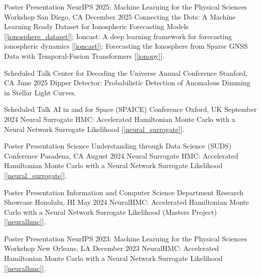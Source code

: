 
\begin{cventries}

\vspace{0mm}

\cventry
{Poster Presentation}
{NeurIPS 2025: Machine Learning for the Physical Sciences Workshop}
{San Diego, CA}
{December 2025}
{
    Connecting the Dots: A Machine Learning Ready Dataset for Ionospheric Forecasting Models [\ref{ionosphere_dataset}]; Ioncast: A deep learning framework for forecasting ionospheric dynamics [\ref{ioncast}]; Forecasting the Ionosphere from Sparse GNSS Data with Temporal-Fusion Transformers [\ref{ionopy}].
}

\vspace{0mm}

\cventry
{Scheduled Talk}
{Center for Decoding the Universe Annual Conference}
{Stanford, CA}
{June 2025}
{
    Dipper Detector: Probabilistic Detection of Anomalous Dimming in Stellar Light Curves.
}

\vspace{0mm}

\cventry
{Scheduled Talk}
{AI in and for Space (SPAICE) Conference}
{Oxford, UK}
{September 2024}
{
    Neural Surrogate HMC: Accelerated Hamiltonian Monte Carlo with a Neural Network Surrogate Likelihood [\ref{neural_surrogate}].
}

\vspace{0mm}

\cventry
{Poster Presentation}
{Science Understanding through Data Science (SUDS) Conference}
{Pasadena, CA}
{August 2024}
{
    Neural Surrogate HMC: Accelerated Hamiltonian Monte Carlo with a Neural Network Surrogate Likelihood [\ref{neural_surrogate}].
}

\vspace{0mm}

\cventry
{Poster Presentation}
{Information and Computer Science Department Research Showcase}
{Honolulu, HI}
{May 2024}
{
    NeuralHMC: Accelerated Hamiltonian Monte Carlo with a Neural Network Surrogate Likelihood (Masters Project) [\ref{neuralhmc}].
}

\vspace{0mm}

\cventry
{Poster Presentation}
{NeurIPS 2023: Machine Learning for the Physical Sciences Workshop}
{New Orleans, LA}
{December 2023}
{
    NeuralHMC: Accelerated Hamiltonian Monte Carlo with a Neural Network Surrogate Likelihood [\ref{neuralhmc}].
}


\end{cventries}
